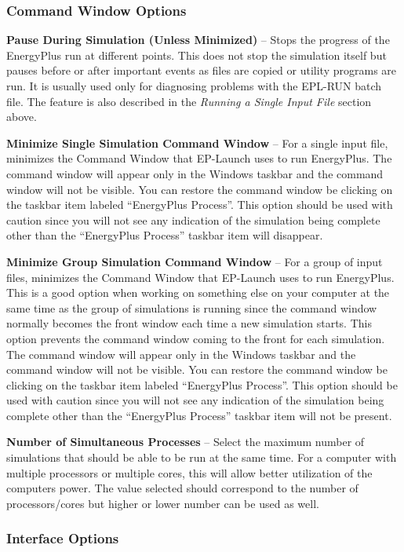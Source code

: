 \subsubsection{Command Window Options}\label{command-window-options}

\textbf{Pause During Simulation (Unless Minimized)} -- Stops the progress of the EnergyPlus run at different points. This does not stop the simulation itself but pauses before or after important events as files are copied or utility programs are run. It is usually used only for diagnosing problems with the EPL-RUN batch file. The feature is also described in the \emph{Running a Single Input File} section above.

\textbf{Minimize Single Simulation Command Window} -- For a single input file, minimizes the Command Window that EP-Launch uses to run EnergyPlus. The command window will appear only in the Windows taskbar and the command window will not be visible. You can restore the command window be clicking on the taskbar item labeled ``EnergyPlus Process''. This option should be used with caution since you will not see any indication of the simulation being complete other than the ``EnergyPlus Process'' taskbar item will disappear.

\textbf{Minimize Group Simulation Command Window} -- For a group of input files, minimizes the Command Window that EP-Launch uses to run EnergyPlus. This is a good option when working on something else on your computer at the same time as the group of simulations is running since the command window normally becomes the front window each time a new simulation starts. This option prevents the command window coming to the front for each simulation. The command window will appear only in the Windows taskbar and the command window will not be visible. You can restore the command window be clicking on the taskbar item labeled ``EnergyPlus Process''. This option should be used with caution since you will not see any indication of the simulation being complete other than the ``EnergyPlus Process'' taskbar item will not be present.

\textbf{Number of Simultaneous Processes} -- Select the maximum number of simulations that should be able to be run at the same time. For a computer with multiple processors or multiple cores, this will allow better utilization of the computers power. The value selected should correspond to the number of processors/cores but higher or lower number can be used as well.

\subsubsection{Interface Options}\label{interface-options}

